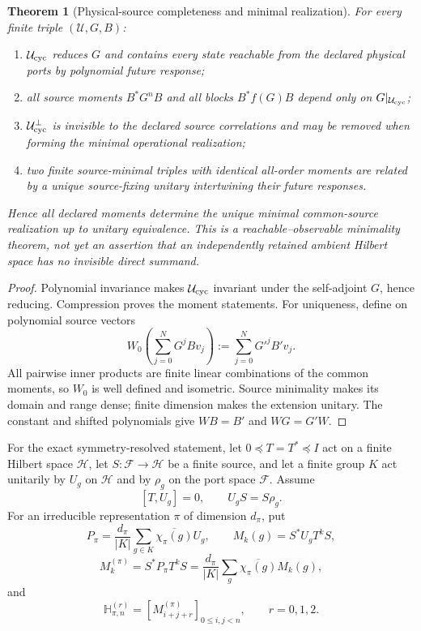 \documentclass[11pt]{article}
\newtheorem{theorem}{Theorem}[section]
\theoremstyle{definition}
\theoremstyle{remark}
\newcommand{\Hh}{\mathcal H}
\begin{document}
\begin{theorem}[Physical-source completeness and minimal realization]
\label{thm:physical-source-completeness}
For every finite triple $(\mathcal U,G,B)$:
\begin{enumerate}[label=\textup{(\roman*)},leftmargin=2.7em]
\item $\mathcal U_{\rm cyc}$ reduces $G$ and contains every state reachable
      from the declared physical ports by polynomial future response;
\item all source moments $B^*G^nB$ and all blocks $B^*f(G)B$ depend only on
      $G|_{\mathcal U_{\rm cyc}}$;
\item $\mathcal U_{\rm cyc}^\perp$ is invisible to the declared source
      correlations and may be removed when forming the minimal operational
      realization;
\item two finite source-minimal triples with identical all-order moments are
      related by a unique source-fixing unitary intertwining their future
      responses.
\end{enumerate}
Hence all declared moments determine the unique minimal common-source
realization up to unitary equivalence.  This is a reachable--observable
minimality theorem, not yet an assertion that an independently retained ambient
Hilbert space has no invisible direct summand.
\end{theorem}

\begin{proof}
Polynomial invariance makes $\mathcal U_{\rm cyc}$ invariant under the
self-adjoint $G$, hence reducing.  Compression proves the moment statements.
For uniqueness, define on polynomial source vectors
\[
 W_0\left(\sum_{j=0}^NG^jBv_j\right)
 :=\sum_{j=0}^NG'^jB'v_j.
\]
All pairwise inner products are finite linear combinations of the common
moments, so $W_0$ is well defined and isometric.  Source minimality makes its
domain and range dense; finite dimension makes the extension unitary.  The
constant and shifted polynomials give $WB=B'$ and $WG=G'W$.
\end{proof}

For the exact symmetry-resolved statement, let $0\preceq T=T^*\preceq I$ act on
a finite Hilbert space $\Hh$, let $S:\mathcal F\to\Hh$ be a finite source, and
let a finite group $K$ act unitarily by $U_g$ on $\Hh$ and by $\rho_g$ on the
port space $\mathcal F$.  Assume
\[
 [T,U_g]=0,\qquad U_gS=S\rho_g.
\]
For an irreducible representation $\pi$ of dimension $d_\pi$, put
\[
 P_\pi=\frac{d_\pi}{|K|}\sum_{g\in K}
       \overline{\chi_\pi(g)}U_g,
 \qquad
 M_k(g)=S^*U_gT^kS,
\]
\[
 M_k^{(\pi)}=S^*P_\pi T^kS
 =\frac{d_\pi}{|K|}\sum_g\overline{\chi_\pi(g)}M_k(g),
\]
and
\[
 \mathbb H_{\pi,n}^{(r)}
 =[M_{i+j+r}^{(\pi)}]_{0\le i,j<n},\qquad r=0,1,2.
\]
\end{document}
